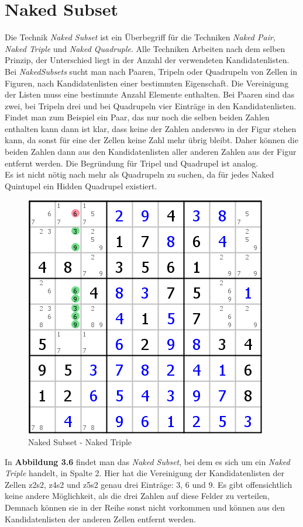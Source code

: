 \newpage
\section{Naked Subset}
Die Technik \textit{Naked Subset} ist ein Überbegriff für die Techniken \textit{Naked Pair}, \textit{Naked Triple} und \textit{Naked Quadruple}. Alle Techniken Arbeiten nach dem selben Prinzip, der Unterschied liegt in der Anzahl der verwendeten Kandidatenlisten. Bei \textit{NakedSubsets} sucht man nach Paaren, Tripeln oder Quadrupeln von Zellen in Figuren, nach Kandidatenlisten einer bestimmten Eigenschaft. Die Vereinigung der Listen muss eine bestimmte Anzahl Elemente enthalten. Bei Paaren sind das zwei, bei Tripeln drei und bei Quadrupeln vier Einträge in den Kandidatenlisten.\\
Findet man zum Beispiel ein Paar, das nur noch die selben beiden Zahlen enthalten kann dann ist klar, dass keine der Zahlen anderswo in der Figur stehen kann, da sonst für eine der Zellen keine Zahl mehr übrig bleibt. Daher können die beiden Zahlen dann aus den Kandidatenlisten aller anderen Zahlen aus der Figur entfernt werden.
Die Begründung für Tripel und Quadrupel ist analog.\\
Es ist nicht nötig nach mehr als Quadrupeln zu suchen, da für jedes Naked Quintupel ein Hidden Quadrupel existiert.

\begin{figure}[h]
\begin{center}
\includegraphics{./img/naked_subset.png}
\caption{Naked Subset - Naked Triple}
\end{center}
\end{figure}

In \textbf{Abbildung 3.6} findet man das \textit{Naked Subset}, bei dem es sich um ein \textit{Naked Triple} handelt, in Spalte 2. Hier hat die Vereinigung der Kandidatenlisten der Zellen z2s2, z4s2 und z5s2 genau drei Einträge: 3, 6 und 9. Es gibt offensichtlich keine andere Möglichkeit, als die drei Zahlen auf diese Felder zu verteilen, Demnach können sie in der Reihe sonst nicht vorkommen und können aus den Kandidatenlisten der anderen Zellen entfernt werden.

